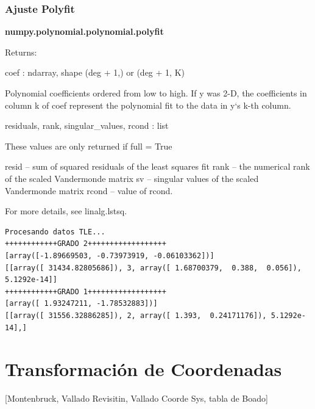\subsubsection{Ajuste Polyfit}

{\bf{numpy.polynomial.polynomial.polyfit}}

Returns:	

coef : ndarray, shape (deg + 1,) or (deg + 1, K)

    Polynomial coefficients ordered from low to high. If y was 2-D, the coefficients in column k of coef represent the polynomial fit to the data in y‘s k-th column.

residuals, rank, singular\_values, rcond : list

    These values are only returned if full = True

    resid – sum of squared residuals of the least squares fit rank – the numerical rank of the scaled Vandermonde matrix sv – singular values of the scaled Vandermonde matrix rcond – value of rcond.

    For more details, see linalg.lstsq.

\begin{verbatim}
Procesando datos TLE...
++++++++++++GRADO 2++++++++++++++++++
[array([-1.89669503, -0.73973919, -0.06103362])]
[[array([ 31434.82805686]), 3, array([ 1.68700379,  0.388,  0.056]), 5.1292e-14]]
++++++++++++GRADO 1++++++++++++++++++
[array([ 1.93247211, -1.78532883])]
[[array([ 31556.32886285]), 2, array([ 1.393,  0.24171176]), 5.1292e-14],]
\end{verbatim}

% 

\section{Transformaci\'on de Coordenadas}
[Montenbruck, Vallado Revisitin, Vallado Coorde Sys, tabla de Boado]

